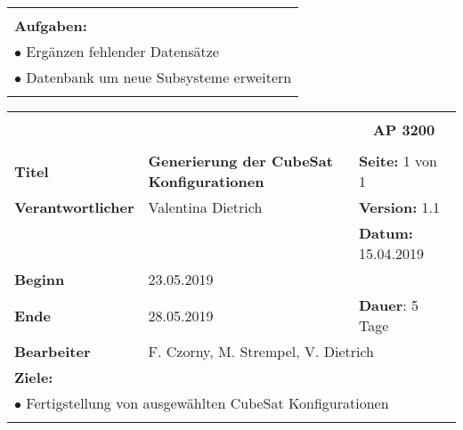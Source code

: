 \begin{table}[!h]
\begin{center}
\begin{tabular}{|p{35mm}||p{55mm}|p{50mm}||p{40mm}|}
   \multicolumn{4}{|p{150mm}|}{}\\
   \multicolumn{4}{|p{150mm}|}{\textbf{Aufgaben:}}\\
   \multicolumn{4}{|p{150mm}|}{$\bullet$ Ergänzen fehlender Datensätze}\\
	 \multicolumn{4}{|p{150mm}|}{$\bullet$ Datenbank um neue Subsysteme erweitern}\\
   \multicolumn{4}{|p{150mm}|}{}\\
   \hline
  \end{tabular}
 \end{center}
\end{table}

\clearpage
\begin{table}[!h]
 \begin{center}
  \begin{tabular}{|p{35mm}||p{55mm}|p{50mm}||p{40mm}|}
   \hline
   \multicolumn{3}{|l||}{\textbf{}} & \multicolumn{1}{c|}{}\\
   \multicolumn{3}{|l||}{\textbf{}} & \multicolumn{1}{c|}{\textbf{AP 3200}}\\
   \multicolumn{3}{|l||}{\textbf{}} & \multicolumn{1}{c|}{}\\
   \hline\hline
   \textbf{Titel} & \multicolumn{2}{p{7cm}||}{\textbf{Generierung der CubeSat Konfigurationen}} & \textbf{Seite:} 1 von 1\\
   \hline
   \textbf{Verantwortlicher} & \multicolumn{2}{l||}{Valentina Dietrich} & \textbf{Version:} 1.1\\
   \hline
   \multicolumn{3}{|l||}{} & \textbf{Datum:} 15.04.2019\\
   \hline\hline
   \textbf{Beginn} & \multicolumn{2}{l||}{23.05.2019} & \\
   \hline
   \textbf{Ende} & \multicolumn{2}{l||}{28.05.2019} & \textbf{Dauer}: 5 Tage\\
   \hline\hline
   \textbf{Bearbeiter} & \multicolumn{3}{l|}{F. Czorny, M. Strempel, V. Dietrich}\\
   \hline\hline
   \multicolumn{4}{|p{150mm}|}{\textbf{Ziele:}}\\
	 \multicolumn{4}{|p{150mm}|}{$\bullet$ Fertigstellung von ausgewählten CubeSat Konfigurationen}\\
   \multicolumn{4}{|p{150mm}|}{}\\

\end{tabular}
\end{center}
\end{table}
